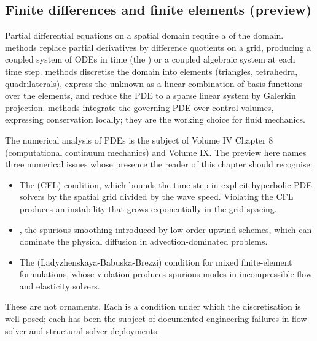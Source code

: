 \subsection{Finite differences and finite elements (preview)}

Partial differential equations on a spatial domain require a
 of the domain. 
methods replace partial derivatives by difference quotients on a
grid, producing a coupled system of ODEs in time (the
) or a coupled algebraic system at each
time step.  methods discretise the domain
into elements (triangles, tetrahedra, quadrilaterals), express the
unknown as a linear combination of basis functions over the
elements, and reduce the PDE to a sparse linear system by Galerkin
projection.  methods integrate the
governing PDE over control volumes, expressing conservation
locally; they are the working choice for fluid mechanics.

The numerical analysis of PDEs is the subject of Volume IV
Chapter 8 (computational continuum mechanics) and Volume IX. The
preview here names three numerical issues whose presence the
reader of this chapter should recognise:

\begin{itemize}[leftmargin=*]
  \item The  (CFL) condition,
    which bounds the time step in explicit hyperbolic-PDE solvers
    by the spatial grid divided by the wave speed. Violating the
    CFL produces an instability that grows exponentially in the
    grid spacing.
  \item {}, the spurious smoothing
    introduced by low-order upwind schemes, which can dominate
    the physical diffusion in advection-dominated problems.
  \item The  (Ladyzhenskaya-Babuska-Brezzi)
    condition for mixed finite-element formulations, whose
    violation produces spurious modes in incompressible-flow and
    elasticity solvers.
\end{itemize}

These are not ornaments. Each is a condition under which the
discretisation is well-posed; each has been the subject of
documented engineering failures in flow-solver and
structural-solver deployments.

